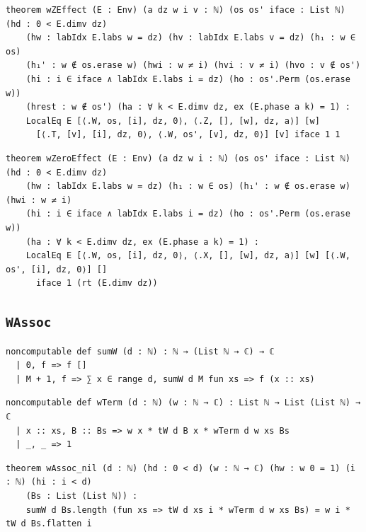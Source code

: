 \begin{lstlisting}[style=leancore]
theorem wZEffect (E : Env) (a dz w i v : ℕ) (os os' iface : List ℕ) (hd : 0 < E.dimv dz)
    (hw : labIdx E.labs w = dz) (hv : labIdx E.labs v = dz) (h₁ : w ∈ os)
    (h₁' : w ∉ os.erase w) (hwi : w ≠ i) (hvi : v ≠ i) (hvo : v ∉ os')
    (hi : i ∈ iface ∧ labIdx E.labs i = dz) (ho : os'.Perm (os.erase w))
    (hrest : w ∉ os') (ha : ∀ k < E.dimv dz, ex (E.phase a k) = 1) :
    LocalEq E [⟨.W, os, [i], dz, 0⟩, ⟨.Z, [], [w], dz, a⟩] [w]
      [⟨.T, [v], [i], dz, 0⟩, ⟨.W, os', [v], dz, 0⟩] [v] iface 1 1
\end{lstlisting}
\begin{lstlisting}[style=leancore]
theorem wZeroEffect (E : Env) (a dz w i : ℕ) (os os' iface : List ℕ) (hd : 0 < E.dimv dz)
    (hw : labIdx E.labs w = dz) (h₁ : w ∈ os) (h₁' : w ∉ os.erase w) (hwi : w ≠ i)
    (hi : i ∈ iface ∧ labIdx E.labs i = dz) (ho : os'.Perm (os.erase w))
    (ha : ∀ k < E.dimv dz, ex (E.phase a k) = 1) :
    LocalEq E [⟨.W, os, [i], dz, 0⟩, ⟨.X, [], [w], dz, a⟩] [w] [⟨.W, os', [i], dz, 0⟩] []
      iface 1 (rt (E.dimv dz))
\end{lstlisting}

\subsection{\texttt{WAssoc}}
\begin{lstlisting}[style=leancore]
noncomputable def sumW (d : ℕ) : ℕ → (List ℕ → ℂ) → ℂ
  | 0, f => f []
  | M + 1, f => ∑ x ∈ range d, sumW d M fun xs => f (x :: xs)
\end{lstlisting}
\begin{lstlisting}[style=leancore]
noncomputable def wTerm (d : ℕ) (w : ℕ → ℂ) : List ℕ → List (List ℕ) → ℂ
  | x :: xs, B :: Bs => w x * tW d B x * wTerm d w xs Bs
  | _, _ => 1
\end{lstlisting}
\begin{lstlisting}[style=leancore]
theorem wAssoc_nil (d : ℕ) (hd : 0 < d) (w : ℕ → ℂ) (hw : w 0 = 1) (i : ℕ) (hi : i < d)
    (Bs : List (List ℕ)) :
    sumW d Bs.length (fun xs => tW d xs i * wTerm d w xs Bs) = w i * tW d Bs.flatten i
\end{lstlisting}


